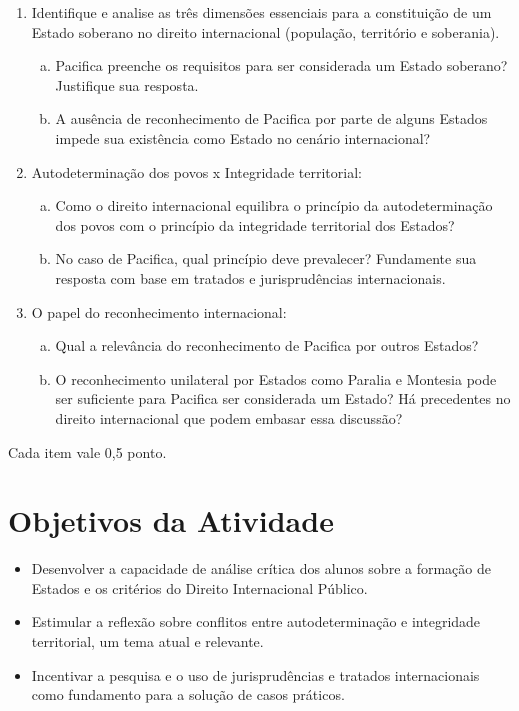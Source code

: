\documentclass{article}
\begin{document}
    \begin{enumerate}[1)]
        \item Identifique e analise as três dimensões essenciais para a constituição de um Estado soberano no direito internacional (população, território e soberania).
        \begin{enumerate}[(a)]
            \item Pacifica preenche os requisitos para ser considerada um Estado soberano? Justifique sua resposta.
            \item A ausência de reconhecimento de Pacifica por parte de alguns Estados impede sua existência como Estado no cenário internacional?
        \end{enumerate}
        \item Autodeterminação dos povos x Integridade territorial:
        \begin{enumerate}[(a)]
            \item Como o direito internacional equilibra o princípio da autodeterminação dos povos com o princípio da integridade territorial dos Estados?
            \item No caso de Pacifica, qual princípio deve prevalecer? Fundamente sua resposta com base em tratados e jurisprudências internacionais.
        \end{enumerate}
        \item O papel do reconhecimento internacional:
        \begin{enumerate}[(a)]
            \item Qual a relevância do reconhecimento de Pacifica por outros Estados?
            \item O reconhecimento unilateral por Estados como Paralia e Montesia pode ser suficiente para Pacifica ser considerada um Estado? Há precedentes no direito internacional que podem embasar essa discussão?
        \end{enumerate}
    \end{enumerate}
Cada item vale 0,5 ponto.

\section{Objetivos da Atividade}

\begin{itemize}
    \item Desenvolver a capacidade de análise crítica dos alunos sobre a formação de Estados e os critérios do Direito Internacional Público.
    \item Estimular a reflexão sobre conflitos entre autodeterminação e integridade territorial, um tema atual e relevante.
    \item Incentivar a pesquisa e o uso de jurisprudências e tratados internacionais como fundamento para a solução de casos práticos.
\end{itemize}
\end{document}
